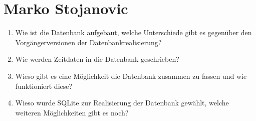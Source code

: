 \documentclass[a4paper]{report}
\begin{document}
\chapter{Marko Stojanovic}
\begin{enumerate}
\item Wie ist die Datenbank aufgebaut, welche Unterschiede gibt es gegenüber den Vorgängerversionen der Datenbankrealisierung?
\item Wie werden Zeitdaten in die Datenbank geschrieben?
\item Wieso gibt es eine Möglichkeit die Datenbank zusammen zu fassen und wie funktioniert diese?
\item Wieso wurde SQLite zur Realisierung der Datenbank gewählt, welche weiteren Möglichkeiten gibt es noch?
\end{enumerate}
\end{document}
